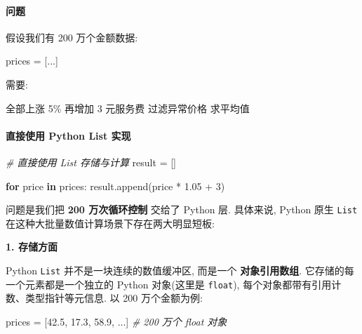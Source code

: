 \documentclass[11pt]{article}
\newenvironment{Shaded}{}{}
\newcommand{\KeywordTok}[1]{\textcolor[rgb]{0.00,0.44,0.13}{\textbf{{#1}}}}
\newcommand{\DecValTok}[1]{\textcolor[rgb]{0.25,0.63,0.44}{{#1}}}
\newcommand{\FloatTok}[1]{\textcolor[rgb]{0.25,0.63,0.44}{{#1}}}
\newcommand{\CommentTok}[1]{\textcolor[rgb]{0.38,0.63,0.69}{\textit{{#1}}}}
\newcommand{\NormalTok}[1]{{#1}}
\newcommand{\ControlFlowTok}[1]{\textcolor[rgb]{0.00,0.44,0.13}{\textbf{{#1}}}}
\newcommand{\OperatorTok}[1]{\textcolor[rgb]{0.40,0.40,0.40}{{#1}}}
\begin{document}
    \paragraph{问题}\label{ux95eeux9898}

    假设我们有 200 万个金额数据:

\begin{Shaded}
\begin{Highlighting}[]
\NormalTok{prices }\OperatorTok{=}\NormalTok{ [...]}
\end{Highlighting}
\end{Shaded}

需要:

\begin{Shaded}
\begin{Highlighting}[]
\NormalTok{全部上涨 5\%}
\NormalTok{再增加 3 元服务费}
\NormalTok{过滤异常价格}
\NormalTok{求平均值}
\end{Highlighting}
\end{Shaded}

    \paragraph{直接使用 Python List
实现}\label{ux76f4ux63a5ux4f7fux7528-python-list-ux5b9eux73b0}

    \begin{Shaded}
\begin{Highlighting}[]
\CommentTok{\# 直接使用 List 存储与计算}
\NormalTok{result }\OperatorTok{=}\NormalTok{ []}

\ControlFlowTok{for}\NormalTok{ price }\KeywordTok{in}\NormalTok{ prices:}
\NormalTok{    result.append(price }\OperatorTok{*} \FloatTok{1.05} \OperatorTok{+} \DecValTok{3}\NormalTok{)}
\end{Highlighting}
\end{Shaded}

问题是我们把 \textbf{200 万次循环控制} 交给了 Python 层. 具体来说,
Python 原生 \texttt{List} 在这种大批量数值计算场景下存在两大明显短板:

\textbf{1. 存储方面}

Python \texttt{List} 并不是一块连续的数值缓冲区, 而是一个
\textbf{对象引用数组}. 它存储的每一个元素都是一个独立的 Python
对象(这里是 \texttt{float}), 每个对象都带有引用计数、类型指针等元信息.
以 200 万个金额为例:

\begin{Shaded}
\begin{Highlighting}[]
\NormalTok{prices }\OperatorTok{=}\NormalTok{ [}\FloatTok{42.5}\NormalTok{, }\FloatTok{17.3}\NormalTok{, }\FloatTok{58.9}\NormalTok{, ...]   }\CommentTok{\# 200 万个 float 对象}
\end{Highlighting}
\end{Shaded}
\end{document}
